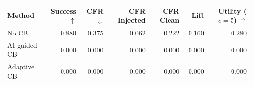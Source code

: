\begin{tabular}{lrrrrrr}
\toprule
Method & Success $\uparrow$ & CFR $\downarrow$ & CFR Injected & CFR Clean & Lift & Utility ($c=5$) $\uparrow$ \\
\midrule
No CB & 0.880 & 0.375 & 0.062 & 0.222 & -0.160 & 0.280 \\
AI-guided CB & 0.000 & 0.000 & 0.000 & 0.000 & 0.000 & 0.000 \\
Adaptive CB & 0.000 & 0.000 & 0.000 & 0.000 & 0.000 & 0.000 \\
\bottomrule
\end{tabular}
